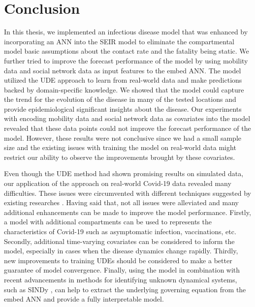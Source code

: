 \chapter{Conclusion}
\label{chap:conclusion}

In this thesis, we implemented an infectious disease model that was enhanced by incorporating an \gls{ANN} into the \gls{SEIR} model to eliminate the compartmental model basic assumptions about the contact rate and the fatality being static.
We further tried to improve the forecast performance of the model by using mobility data and social network data as input features to the embed \gls{ANN}.
The model utilized the \gls{UDE} approach \cite{rackauckasUniversalDifferentialEquations2020} to learn from real-world data and make predictions backed by domain-specific knowledge.
We showed that the model could capture the trend for the evolution of the disease in many of the tested locations and provide epidemiological significant insights about the disease.
Our experiments with encoding mobility data and social network data as covariates into the model revealed that these data points could not improve the forecast performance of the model.
However, these results were not conclusive since we had a small sample size and the existing issues with training the model on real-world data might restrict our ability to observe the improvements brought by these covariates.

Even though the \gls{UDE} method had shown promising results on simulated data, our application of the approach on real-world Covid-19 data revealed many difficulties.
These issues were circumvented with different techniques suggested by existing researches \cite{kimStiffNeuralOrdinary2021,rackauckasUniversalDifferentialEquations2020}.
Having said that, not all issues were alleviated and many additional enhancements can be made to improve the model performance.
Firstly, a model with additional compartments can be used to represents the characteristics of Covid-19 such as asymptomatic infection, vaccinations, etc.
Secondly, additional time-varying covariates can be considered to inform the model, especially in cases when the disease dynamics change rapidly.
Thirdly, new improvements to training \glspl{UDE} should be considered to make a better guarantee of model convergence.
Finally, using the model in combination with recent advancements in methods for identifying unknown dynamical systems, such as \gls{SINDy} \cite{bruntonDiscoveringGoverningEquations2016}, can help to extract the underlying governing equation from the embed \gls{ANN} and provide a fully interpretable model.